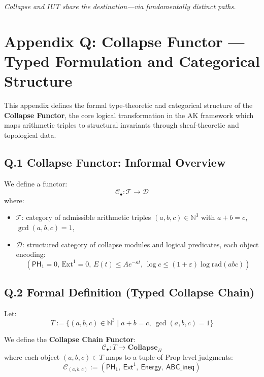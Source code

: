 \documentclass[11pt]{article}
\begin{document}
\begin{center}
\textit{Collapse and IUT share the destination—via fundamentally distinct paths.}
\end{center}



\section*{Appendix Q: Collapse Functor — Typed Formulation and Categorical Structure}

This appendix defines the formal type-theoretic and categorical structure of the \textbf{Collapse Functor},  
the core logical transformation in the AK framework which maps arithmetic triples to structural invariants  
through sheaf-theoretic and topological data.

\subsection*{Q.1 Collapse Functor: Informal Overview}

We define a functor:
\[
\mathcal{C}_\bullet : \mathcal{T} \longrightarrow \mathcal{D}
\]
where:
\begin{itemize}
  \item \( \mathcal{T} \): category of admissible arithmetic triples \( (a,b,c) \in \mathbb{N}^3 \) with \( a + b = c \), \( \gcd(a,b,c) = 1 \),
  \item \( \mathcal{D} \): structured category of collapse modules and logical predicates, each object encoding:
  \[
  (\mathsf{PH}_1 = 0,\, \mathrm{Ext}^1 = 0,\, E(t) \leq Ae^{-\kappa t},\, \log c \leq (1+\varepsilon) \log \mathrm{rad}(abc))
  \]
\end{itemize}

\subsection*{Q.2 Formal Definition (Typed Collapse Chain)}

Let:
\[
T := \{ (a,b,c) \in \mathbb{N}^3 \mid a + b = c,\ \gcd(a,b,c) = 1 \}
\]

We define the \textbf{Collapse Chain Functor}:
\[
\mathcal{C}_\bullet : T \to \mathbf{Collapse}_\Pi
\]
where each object \( (a,b,c) \in T \) maps to a tuple of Prop-level judgments:
\[
\mathcal{C}_{(a,b,c)} := (\mathsf{PH}_1,\ \mathsf{Ext}^1,\ \mathsf{Energy},\ \mathsf{ABC\_ineq})
\]
\end{document}
